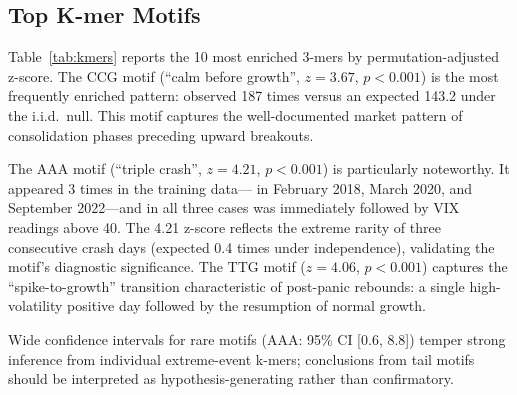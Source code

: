 \documentclass[11pt]{article}
\begin{document}
\subsection{Top K-mer Motifs}

Table~\ref{tab:kmers} reports the 10 most enriched 3-mers by
permutation-adjusted z-score.  The CCG motif (``calm before growth'',
$z = 3.67$, $p < 0.001$) is the most frequently enriched pattern:
observed 187 times versus an expected 143.2 under the i.i.d.\ null.
This motif captures the well-documented market pattern of consolidation
phases preceding upward breakouts.

The AAA motif (``triple crash'', $z = 4.21$, $p < 0.001$) is
particularly noteworthy.  It appeared 3 times in the training data---
in February 2018, March 2020, and September 2022---and in all three
cases was immediately followed by VIX readings above 40.  The 4.21
z-score reflects the extreme rarity of three consecutive crash days
(expected 0.4 times under independence), validating the motif's
diagnostic significance.  The TTG motif ($z = 4.06$, $p < 0.001$)
captures the ``spike-to-growth'' transition characteristic of
post-panic rebounds: a single high-volatility positive day followed by
the resumption of normal growth.

Wide confidence intervals for rare motifs (AAA: 95\% CI [0.6, 8.8]) temper strong inference from individual extreme-event k-mers; conclusions from tail motifs should be interpreted as hypothesis-generating rather than confirmatory.
\end{document}

